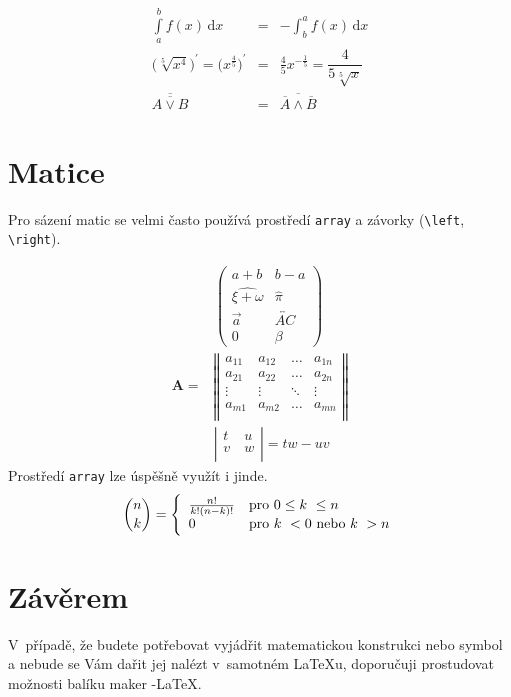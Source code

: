 \documentclass[11pt,a4paper,twocolumn]{article}
\theoremstyle{definition}
\theoremstyle{plain}
\theoremstyle{plain}
\begin{document}
\begin{eqnarray}\label{rovnice2}
\int\limits_{a}^{b} f(x)\,\textrm{d}x &=& - \int_{b}^{a} f(x)\,\textrm{d}x  \\
\Big(\sqrt[5]{x^{4}}\Big) ^{\prime} = \Big(x^{\frac{4}{5}}\Big)^{\prime} &=& \frac{4}{5}x^{-\frac{1}{5}} = \dfrac{4}{5\sqrt[5]{x}} \\
\overline{\overline{A\vee B}} &=& \overline{\overline{A}\wedge\overline{B}}
\end{eqnarray}

\section{Matice}

Pro sázení matic se velmi často používá prostředí \texttt{array} a závorky (\verb;\left;, \verb;\right;). 

\begin{align*}
&\left(\begin{array}{cc}
a+b & b-a \\
\widehat{\xi + \omega} & \hat{\pi} \\
\vec{a} & \overleftrightarrow{AC}\\
0 & \beta
\end{array}\right)\\
\mathbf{A} = &\left\Vert\begin{array}{cccc}
a_{11} & a_{12} & \ldots & a_{1n} \\
a_{21} & a_{22} & \ldots & a_{2n} \\
\vdots & \vdots & \ddots & \vdots \\
a_{m1} & a_{m2} & \ldots & a_{mn} \\
\end{array}\right\Vert\\
&\left\vert\begin{array}{cc}
t & u\\
v~& w \\
\end{array}\right\vert
= tw- uv
\end{align*}
Prostředí \texttt{array} lze úspěšně využít i jinde.
\begin{equation*}
\dbinom{n}{k}  = \Bigg\lbrace
\begin{array}{ll}
\frac{n!}{k!(n-k)!} & \textrm{pro } 0 \leq k~\leq n \\
0 & \textrm{pro } k~< 0 \textrm{ nebo } k~> n
\end{array}
\end{equation*}


\section{Závěrem}

V~případě, že budete potřebovat vyjádřit matematickou konstrukci nebo symbol a nebude se Vám dařit jej nalézt v~samotném \LaTeX u, doporučuji prostudovat možnosti balíku maker \AmS -\LaTeX.
\end{document}

